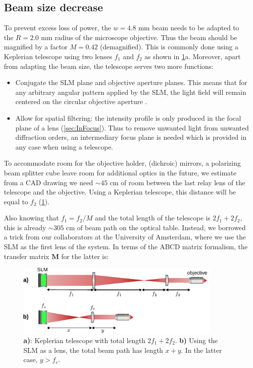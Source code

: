 \subsection{Beam size decrease}

To prevent excess loss of power, the $w = 4.8$ mm beam needs to be adapted to the $R = 2.0$ mm radius of the microscope objective. 
Thus the beam should be magnified by a factor $M=0.42$ (demagnified).
This is commonly done using a Keplerian telescope using two lenses $f_1$ and $f_2$ as shown in \ref{fig:SLMbeampath}a.
Moreover, apart from adapting the beam size, the telescope serves two more functions:

\begin{itemize}
    \item Conjugate the SLM plane and objective aperture planes.
    This means that for any arbitrary angular pattern applied by the SLM, the light field will remain centered on the circular objective aperture \cite{Nogrette2014}. 
    
    \item Allow for spatial filtering: the intensity profile is only produced in the focal plane of a lens (\cref{sec:InFocus}).
    Thus to remove unwanted light from unwanted diffraction orders, an intermediary focus plane is needed which is provided in any case when using a telescope.
\end{itemize}
To accommodate room for the objective holder, (dichroic) mirrors, a polarizing beam splitter cube leave room for additional optics in the future, we estimate from a CAD drawing we need $\sim 45$ cm of room between the last relay lens of the telescope and the objective. 
Using a Keplerian telescope, this distance will be equal to $f_2$ (\cref{fig:SLMbeampath}).

Also knowing that $f_1=f_2/M$ and the total length of the telescope is $2f_1+2f_2$, this is already $\sim 305$ cm of beam path on the optical table. 
Instead, we borrowed a trick from our collaborators at the University of Amsterdam, where we use the SLM as the first lens of the system. 
In terms of the ABCD matrix formalism, the transfer matrix $\mathbf{M}$ for the latter is:

\begin{figure}
	\centering
	\includegraphics[width=0.9\textwidth]{figures/beampathSLM.pdf}
	\caption{\textsf{\textbf{a)}}: Keplerian telescope with total length $2f_1+2f_2$. \textsf{\textbf{b)}} Using the SLM as a lens, the total beam path has length $x+y$. In the latter case, $y>f_r$.}
	\label{fig:SLMbeampath}
\end{figure}

